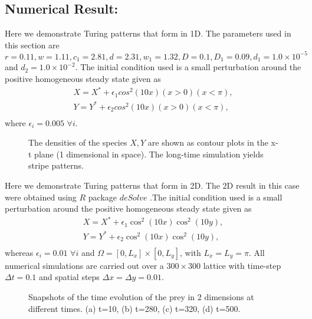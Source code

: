 \documentclass[10pt]{amsart}
\theoremstyle{definition}
\begin{document}
\subsection{Numerical Result:}
Here we demonstrate Turing patterns that form in 1D.  The parameters used in this section are $r               = 0.11, w=1.11, c_{1}=2.81, d = 2.31, w_{1}= 1.32, D=0.1, D_{1}=0.09, d_1=1.0\times 10^{-5}$ and $d_2 =1.0\times 10^{-2}$. The initial condition used is a small perturbation around the positive homogeneous steady state given as 
\begin{align*}
X=X^{*} + \epsilon_1  cos^2(10x)(x > 0)(x < \pi),\\
Y=Y^{*}  + \epsilon_2 cos^2(10x)(x > 0)(x < \pi),\\
\end{align*}
where $ \epsilon_i=0.005$ $\forall i$. 

\begin{figure}[htb]
\caption{The densities of the species $X, Y$ are shown as contour plots in the x-t plane (1 dimensional in space). The long-time simulation yields stripe patterns.  }
\label{fig:1tt}
\end{figure}
Here we demonstrate Turing patterns that form in 2D. The 2D result in this case were obtained using $R$ package $deSolve $ \cite{Rwork}.The initial condition used is a small perturbation around the positive homogeneous steady state given as 
\begin{align*}
X=X^{*} + \epsilon_1  \cos^2(10x)\cos^2(10y),\\
Y=Y^{*}  + \epsilon_2 \cos^2(10x)\cos^2(10y),\\
\end{align*}
whereas $ \epsilon_i=0.01$ $\forall i$ and $\Omega=[0,L_x]\times [0,L_y]$, with $L_x=L_y=\pi$. 
All numerical simulations are carried out over a $300 \times 300$ lattice with time-step $\Delta t = 0.1$ and spatial steps $\Delta x = \Delta y = 0.01$.
\begin{figure}[!htb]
\begin{center}
\end{center}
 \caption{Snapshots of the time evolution of the prey in 2 dimensions at different times. (a) t=10, (b) t=280, (c) t=320, (d) t=500.}
 \label{fig:2t}
\end{figure}
\end{document}
